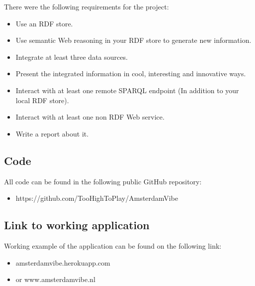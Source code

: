 \documentclass[12pt, a4paper, lithuanian]{article}
\begin{document}
There were the following requirements for the project:

\begin{itemize}
    \item Use an RDF store.

    \item Use semantic Web reasoning in your RDF store to generate new information.

    \item Integrate at least three data sources.

    \item Present the integrated information in cool, interesting and innovative ways.

    \item Interact with at least one remote SPARQL endpoint (In addition to your local RDF store).

    \item Interact with at least one non RDF Web service.

    \item Write a report about it.

\end{itemize}


\subsection{Code}

All code can be found in the following public GitHub repository:

\begin{itemize}

  \item https://github.com/TooHighToPlay/AmsterdamVibe

\end{itemize}

\subsection{Link to working application}

Working example of the application can be found on the following link:

\begin{itemize}

  \item amsterdamvibe.herokuapp.com

  \item or www.amsterdamvibe.nl

\end{itemize}
\end{document}
